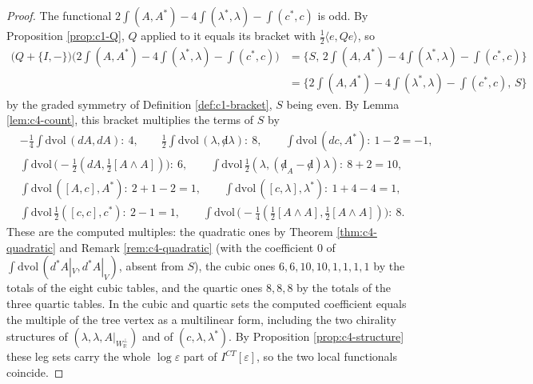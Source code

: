 \begin{proof}
The functional $2\int(A,A^*)-4\int(\lambda^*,\lambda)-\int(c^*,c)$ is odd. By Proposition \ref{prop:c1-Q}, $Q$ applied to it equals its bracket with $\tfrac12\langle e,Qe\rangle$, so
\[
\begin{aligned}
\big(Q+\{I,-\}\big)\Big(2\int(A,A^*)-4\int(\lambda^*,\lambda)-\int(c^*,c)\Big)&=\Big\{S,\,2\int(A,A^*)-4\int(\lambda^*,\lambda)-\int(c^*,c)\Big\}\\
&=\Big\{2\int(A,A^*)-4\int(\lambda^*,\lambda)-\int(c^*,c),\,S\Big\}
\end{aligned}
\]
by the graded symmetry of Definition \ref{def:c1-bracket}, $S$ being even. By Lemma \ref{lem:c4-count}, this bracket multiplies the terms of $S$ by
\[
\begin{aligned}
&-\tfrac14\int\mathrm{dvol}\,(dA,dA):\ 4,\qquad \tfrac12\int\mathrm{dvol}\,(\lambda,{\not d}\lambda):\ 8,\qquad \int\mathrm{dvol}\,(dc,A^*):\ 1-2=-1,\\
&\int\mathrm{dvol}\,\big(-\tfrac12(dA,\tfrac12[A\wedge A])\big):\ 6,\qquad \int\mathrm{dvol}\,\tfrac12(\lambda,({\not d}_A-{\not d})\lambda):\ 8+2=10,\\
&\int\mathrm{dvol}\,([A,c],A^*):\ 2+1-2=1,\qquad \int\mathrm{dvol}\,([c,\lambda],\lambda^*):\ 1+4-4=1,\\
&\int\mathrm{dvol}\,\tfrac12([c,c],c^*):\ 2-1=1,\qquad \int\mathrm{dvol}\,\big(-\tfrac14(\tfrac12[A\wedge A],\tfrac12[A\wedge A])\big):\ 8 .
\end{aligned}
\]
These are the computed multiples: the quadratic ones by Theorem \ref{thm:c4-quadratic} and Remark \ref{rem:c4-quadratic} (with the coefficient $0$ of $\int\mathrm{dvol}\,(d^*A|_V,d^*A|_V)$, absent from $S$), the cubic ones $6,6,10,10,1,1,1,1$ by the totals of the eight cubic tables, and the quartic ones $8,8,8$ by the totals of the three quartic tables. In the cubic and quartic sets the computed coefficient equals the multiple of the tree vertex as a multilinear form, including the two chirality structures of $(\lambda,\lambda,A|_{W_{\mathbb R}^\perp})$ and of $(c,\lambda,\lambda^*)$. By Proposition \ref{prop:c4-structure} these leg sets carry the whole $\log\varepsilon$ part of $I^{CT}[\varepsilon]$, so the two local functionals coincide.
\end{proof}


